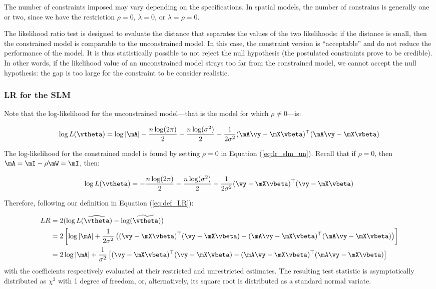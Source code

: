 \documentclass[english,12pt]{book}\usepackage[]{graphicx}\usepackage[]{xcolor}
\begin{document}
The number of constraints imposed may vary depending on the specifications. In spatial models, the number of constrains is generally one or two, since we have the restriction $\rho = 0$, $\lambda = 0$, or $\lambda = \rho = 0$.

The likelihood ratio test is designed to evaluate the distance that separates the values of the two likelihoods: if the distance is small, then the constrained model is comparable to the unconstrained model. In this case, the constraint version is ``acceptable'' and do not reduce the performance of the model. It is thus statistically possible to not reject the null hypothesis (the postulated constraints prove to be credible). In other words, if the likelihood value of an unconstrained model strays too far from the constrained model, we cannot accept the null hypothesis: the gap is too large for the constraint to be consider realistic. 

\subsubsection{LR for the SLM}

Note that the log-likelihood for the unconstrained model---that is the model for which $\rho \neq  0$---is:

\begin{equation}\label{eq:lr_slm_un}
\log L(\vtheta) = \log\left| \mA\right| - \frac{n\log(2\pi)}{2} - \frac{n\log(\sigma^2)}{2} - \frac{1}{2\sigma^2}(\mA\vy-\mX\vbeta)^\top(\mA\vy-\mX\vbeta) 
\end{equation}

The log-likelihood for the constrained model is found by setting $\rho = 0$ in Equation (\ref{eq:lr_slm_un}). Recall that if $\rho = 0$, then $\mA = \mI - \rho\mW = \mI$, then: 

\begin{equation}
\log L(\vtheta) =  - \frac{n\log(2\pi)}{2} - \frac{n\log(\sigma^2)}{2} - \frac{1}{2\sigma^2}(\vy-\mX\vbeta)^\top (\vy-\mX\vbeta) 
\end{equation}

Therefore, following our definition in Equation (\ref{eq:def_LR}): 

\begin{equation}
  \begin{aligned}
LR  & = 2 (\log L(\widehat{\vtheta}) - \log (\widetilde{\vtheta})) \\
    & = 2\left[\log\left| \mA\right| + \frac{1}{2\sigma^2}\left((\vy-\mX\vbeta)^\top (\vy-\mX\vbeta) - (\mA\vy-\mX\vbeta)^\top(\mA\vy-\mX\vbeta) \right) \right] \\
    & = 2\log\left| \mA\right| + \frac{1}{\sigma^2}\left[(\vy-\mX\vbeta)^\top (\vy-\mX\vbeta) - (\mA\vy-\mX\vbeta)^\top(\mA\vy-\mX\vbeta) \right]
\end{aligned}
\end{equation}
%
with the coefficients respectively evaluated at their restricted and unrestricted estimates. The resulting test statistic is asymptotically distributed as $\chi^2$ with 1 degree of freedom, or, alternatively, its square root is distributed as a standard normal variate.
\end{document}
